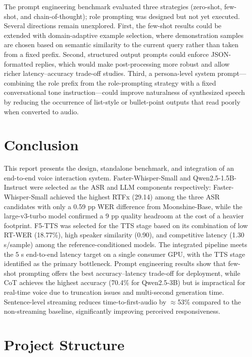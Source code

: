\documentclass[12pt, a4paper]{article}
\begin{document}
The prompt engineering benchmark evaluated three strategies (zero-shot, few-shot, and chain-of-thought); role prompting was designed but not yet executed. Several directions remain unexplored. First, the few-shot results could be extended with domain-adaptive example selection, where demonstration samples are chosen based on semantic similarity to the current query rather than taken from a fixed prefix. Second, structured output prompts could enforce JSON-formatted replies, which would make post-processing more robust and allow richer latency--accuracy trade-off studies. Third, a persona-level system prompt---combining the role prefix from the role-prompting strategy with a fixed conversational tone instruction---could improve naturalness of synthesized speech by reducing the occurrence of list-style or bullet-point outputs that read poorly when converted to audio.

\section{Conclusion}

This report presents the design, standalone benchmark, and integration of an end-to-end voice interaction system. Faster-Whisper-Small and Qwen2.5-1.5B-Instruct were selected as the ASR and LLM components respectively: Faster-Whisper-Small achieved the highest RTFx (29.14) among the three ASR candidates with only a 0.59 pp WER difference from Moonshine-Base, while the large-v3-turbo model confirmed a 9 pp quality headroom at the cost of a heavier footprint. F5-TTS was selected for the TTS stage based on its combination of low RT-WER (18.77\%), high speaker similarity (0.90), and competitive latency (1.30 s/sample) among the reference-conditioned models. The integrated pipeline meets the 5 s end-to-end latency target on a single consumer GPU, with the TTS stage identified as the primary bottleneck. Prompt engineering results show that few-shot prompting offers the best accuracy--latency trade-off for deployment, while CoT achieves the highest accuracy (70.4\% for Qwen2.5-3B) but is impractical for real-time voice due to truncation issues and multi-second generation time. Sentence-level streaming reduces time-to-first-audio by $\approx$53\% compared to the non-streaming baseline, significantly improving perceived responsiveness.

\appendix

\section{Project Structure}
\end{document}
